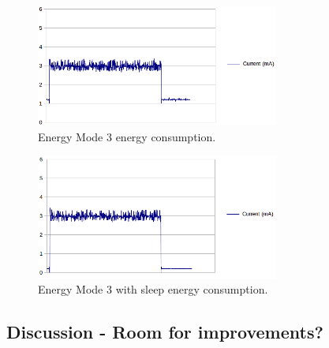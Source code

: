 \begin{figure}[t]
	\centering
	\includegraphics[width=8cm]{img/em3.png}
	\caption{Energy Mode 3 energy consumption.}
	\label{fig:hf}
\end{figure}

\begin{figure}[t]
	\centering
	\includegraphics[width=8cm]{img/em3_sleep.png}
	\caption{Energy Mode 3 with sleep energy consumption.}
	\label{fig:hf}
\end{figure}
\subsection{Discussion - Room for improvements?}

